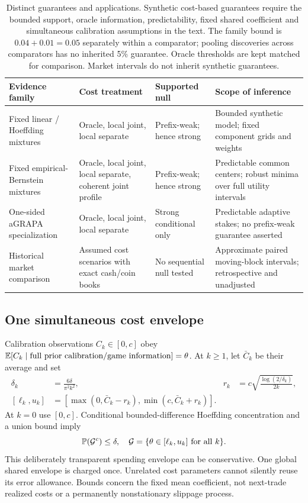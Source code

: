 \begin{table}[tbp]
\centering\small
\begin{tabular}{>{\raggedright\arraybackslash}p{}>{\raggedright\arraybackslash}p{}>{\raggedright\arraybackslash}p{}>{\raggedright\arraybackslash}p{}}
\toprule
Evidence family & Cost treatment & Supported null & Scope of inference\\
\midrule
Fixed linear / Hoeffding mixtures
 & Oracle, local joint, local separate
 & Prefix-weak; hence strong
 & Bounded synthetic model; fixed component grids and weights\\
Fixed empirical-Bernstein mixtures
 & Oracle, local joint, local separate, coherent joint profile
 & Prefix-weak; hence strong
 & Predictable common centers; robust minima over full utility intervals\\
One-sided aGRAPA specialization
 & Oracle, local joint, local separate
 & Strong conditional only
 & Predictable adaptive stakes; no prefix-weak guarantee asserted\\
Historical market comparison
 & Assumed cost scenarios with exact cash/coin books
 & No sequential null tested
 & Approximate paired moving-block intervals; retrospective and unadjusted\\
\bottomrule
\end{tabular}
\caption{Distinct guarantees and applications. Synthetic cost-based guarantees
require the bounded support, oracle information, predictability, fixed shared
coefficient and simultaneous calibration assumptions in the text. The family
bound is $0.04+0.01=0.05$ separately within a comparator; pooling discoveries
across comparators has no inherited 5\% guarantee. Oracle thresholds are kept
matched for comparison. Market intervals do not inherit synthetic guarantees.}
\label{tab:methodscope}
\end{table}

\subsection{One simultaneous cost envelope}

Calibration observations $C_k\in[0,c]$ obey
$\mathbb{E}[C_k\mid\text{full prior calibration/game information}]=\theta$.
At $k\geq1$, let $\bar C_k$ be their average and set
\begin{align}
 \delta_k&=\frac{6\delta}{\pi^2k^2},&
 r_k&=c\sqrt{\frac{\log(2/\delta_k)}{2k}},\\
 [\ell_k,u_k]&=[\max(0,\bar C_k-r_k),\min(c,\bar C_k+r_k)].
\end{align}
At $k=0$ use $[0,c]$. Conditional bounded-difference Hoeffding concentration
and a union bound imply
\begin{equation}
 \mathbb{P}(\mathcal G^c)\leq\delta,\quad
 \mathcal G=\{\theta\in[\ell_k,u_k]\text{ for all }k\}. \label{eq:coverage}
\end{equation}
This deliberately transparent spending envelope can be conservative. One
global shared envelope is charged once. Unrelated cost parameters cannot
silently reuse its error allowance. Bounds concern the fixed mean coefficient,
not next-trade realized costs or a permanently nonstationary slippage process.

